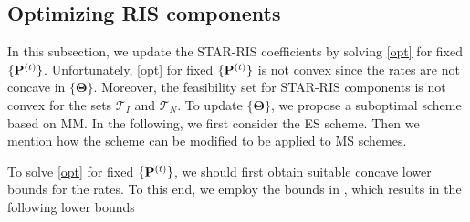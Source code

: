 \documentclass[a4, conference]{IEEEtran}
\theoremstyle{definition}
\begin{document}
\subsection{Optimizing RIS components}
In this subsection, we update the STAR-RIS coefficients by solving \eqref{opt} for fixed $\{{\bf P}^{(t)}\}$. 
Unfortunately, \eqref{opt} for fixed $\{{\bf P}^{(t)}\}$ is not convex since the rates are not concave in $ \{\bm{\Theta}\}$. Moreover, the feasibility set for STAR-RIS components is not convex for the sets $\mathcal{T}_I$ and $\mathcal{T}_N$. To update $ \{\bm{\Theta}\}$, we propose a suboptimal scheme based on MM. In the following, we first consider the ES scheme.  Then we mention how the scheme can be modified to be applied to MS schemes. %


To solve \eqref{opt} for fixed $\{{\bf P}^{(t)}\}$, we should first obtain suitable concave lower bounds for the rates. To this end, we employ the bounds in \cite[Lemma 4]{soleymani2022rate}, which results in the following lower bounds
\end{document}
